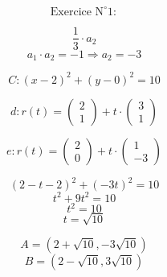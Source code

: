 \documentclass{article}
\begin{document}
\[ \text{Exercice N}^\circ 1: \]

\[ \frac{1}{3} \cdot a_2 \]
\[ a_1 \cdot a_2 = -1 \Rightarrow a_2 = -3 \]

\[ C: (x-2)^2 + (y-0)^2 = 10 \]

\[ d: r(t) = \begin{pmatrix} 2 \\ 1 \end{pmatrix} + t \cdot \begin{pmatrix} 3 \\ 1 \end{pmatrix} \]

\[ e: r(t) = \begin{pmatrix} 2 \\ 0 \end{pmatrix} + t \cdot \begin{pmatrix} 1 \\ -3 \end{pmatrix} \]

\[ (2-t-2)^2 + (-3t)^2 = 10 \]
\[ t^2 + 9t^2 = 10 \]
\[ t^2 = 10 \]
\[ t = \sqrt{10} \]

\[ A = (2 + \sqrt{10}, -3\sqrt{10}) \]
\[ B = (2 - \sqrt{10}, 3\sqrt{10}) \]
\end{document}
